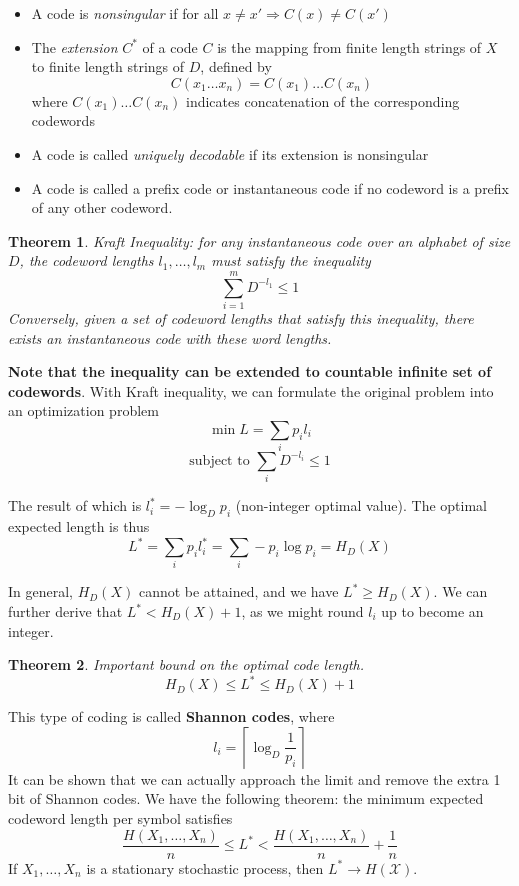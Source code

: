 \documentclass[10pt,landscape, a4paper]{article}
\newtheorem{theorem}{Theorem}
\begin{document}
\begin{multicols}{3}
\begin{itemize}
    \item A code is \textit{nonsingular} if for all $x\ne x'\Rightarrow C(x)\ne C(x')$

    \item The \textit{extension} $C^*$ of a code $C$ is the mapping from finite length strings of $X$ to finite length strings of $D$, defined by
    $$
    C(x_1\dots x_n)=C(x_1)\dots C(x_n)
    $$
    where $C(x_1)\dots C(x_n)$ indicates concatenation of the corresponding codewords

    \item A code is called \textit{uniquely decodable} if its extension is nonsingular

    \item A code is called a prefix code or instantaneous code if no codeword is a prefix of any other codeword.
\end{itemize}

\begin{theorem}
    Kraft Inequality: for any instantaneous code over an alphabet of size $D$, the codeword lengths $l_1,\dots, l_m$ must satisfy the inequality
    $$
    \sum_{i=1}^m D^{-l_1}\le1
    $$
    Conversely, given a set of codeword lengths that satisfy this inequality, there exists an instantaneous code with these word lengths. 
\end{theorem}
\textbf{Note that the inequality can be extended to countable infinite set of codewords}. With Kraft inequality, we can formulate the original problem into an optimization problem
$$
\min L=\sum_i p_il_i
$$
$$
\text{subject to }\sum_{i}D^{-l_i}\le 1
$$

The result of which is $l_i^*=-\log_D p_i$ (non-integer optimal value). The optimal expected length is thus
$$
L^*=\sum_i p_il_i^*=\sum_i -p_i\log p_i=H_D(X)
$$

In general, $H_D(X)$ cannot be attained, and we have $L^*\ge H_D(X)$. We can further derive that $L^*<H_D(X)+1$, as we might round $l_i$ up to become an integer. \begin{theorem}
    Important bound on the optimal code length.
    $$
    H_D(X)\le L^*\le H_D(X)+1
    $$
\end{theorem}
This type of coding is called \textbf{Shannon codes}, where
$$
l_i=\left\lceil\log_D\frac{1}{p_i}\right\rceil
$$
It can be shown that we can actually approach the limit and remove the extra 1 bit of Shannon codes. We have the following theorem: the minimum expected codeword length per symbol satisfies
$$
\frac{H(X_1,\dots, X_n)}{n}\le L^*<\frac{H(X_1,\dots, X_n)}{n}+\frac{1}{n}
$$
If $X_1,\dots, X_n$ is a stationary stochastic process, then $L^*\rightarrow H(\mathcal{X})$. 


\end{multicols}
\end{document}

